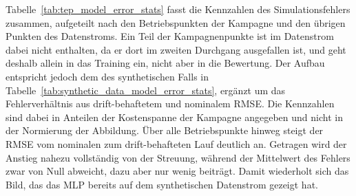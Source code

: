 %
Tabelle~\ref{tab:tep_model_error_stats} fasst die Kennzahlen des Simulationsfehlers zusammen, aufgeteilt nach den Betriebspunkten der Kampagne und den übrigen Punkten des Datenstroms. Ein Teil der Kampagnenpunkte ist im Datenstrom dabei nicht enthalten, da er dort im zweiten Durchgang ausgefallen ist, und geht deshalb allein in das Training ein, nicht aber in die Bewertung. Der Aufbau entspricht jedoch dem des synthetischen Falls in Tabelle~\ref{tab:synthetic_data_model_error_stats}, ergänzt um das Fehlerverhältnis aus drift-behaftetem und nominalem \ac{RMSE}. Die Kennzahlen sind dabei in Anteilen der Kostenspanne der Kampagne angegeben und nicht in der Normierung der Abbildung. Über alle Betriebspunkte hinweg steigt der \ac{RMSE} vom nominalen zum drift-behafteten Lauf deutlich an. Getragen wird der Anstieg nahezu vollständig von der Streuung, während der Mittelwert des Fehlers zwar von Null abweicht, dazu aber nur wenig beiträgt. Damit wiederholt sich das Bild, das das \ac{MLP} bereits auf dem synthetischen Datenstrom gezeigt hat.\par
%
\begin{table}[tbp]
\centering
\caption{Kennzahlen der drift-bedingten Modellverschlechterung}
\label{tab:tep_model_error_stats}
\vspace{3mm}
\end{table}
